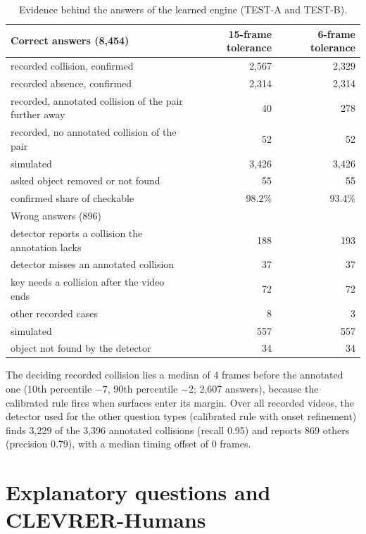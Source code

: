\begin{table}[h]
\caption{Evidence behind the answers of the learned engine (TEST-A and TEST-B).}
\label{tab:evidence}
\centering
\small
\begin{tabular}{@{}lrr@{}}
\toprule
Correct answers (8,454) & 15-frame tolerance & 6-frame tolerance \\
\midrule
recorded collision, confirmed & 2,567 & 2,329 \\
recorded absence, confirmed & 2,314 & 2,314 \\
recorded, annotated collision of the pair further away & 40 & 278 \\
recorded, no annotated collision of the pair & 52 & 52 \\
simulated & 3,426 & 3,426 \\
asked object removed or not found & 55 & 55 \\
\midrule
confirmed share of checkable & 98.2\% & 93.4\% \\
\midrule
Wrong answers (896) & & \\
\midrule
detector reports a collision the annotation lacks & 188 & 193 \\
detector misses an annotated collision & 37 & 37 \\
key needs a collision after the video ends & 72 & 72 \\
other recorded cases & 8 & 3 \\
simulated & 557 & 557 \\
object not found by the detector & 34 & 34 \\
\bottomrule
\end{tabular}
\end{table}

The deciding recorded collision lies a median of 4 frames before the annotated one (10th percentile $-7$, 90th percentile $-2$; 2,607 answers), because the calibrated rule fires when surfaces enter its margin.
Over all recorded videos, the detector used for the other question types (calibrated rule with onset refinement) finds 3,229 of the 3,396 annotated collisions (recall 0.95) and reports 869 others (precision 0.79), with a median timing offset of 0 frames.

\section{Explanatory questions and CLEVRER-Humans}
\label{app:explanatory}

